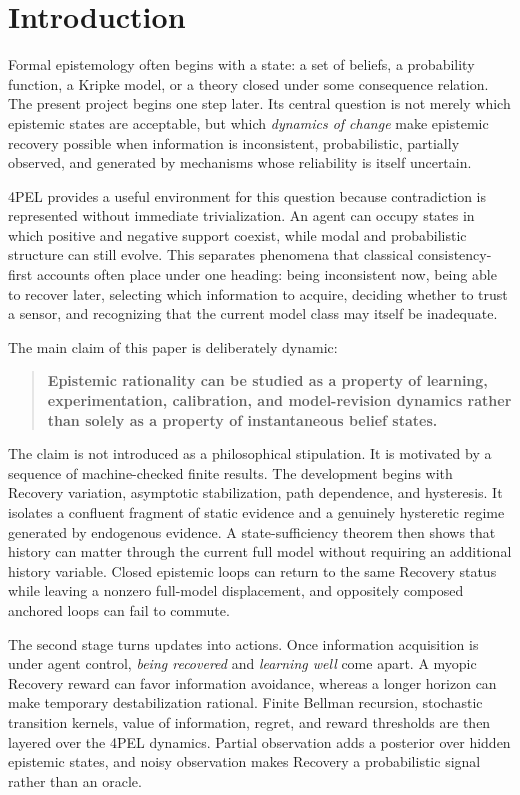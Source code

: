 \section{Introduction}

Formal epistemology often begins with a state: a set of beliefs, a probability function, a Kripke model, or a theory closed under some consequence relation. The present project begins one step later. Its central question is not merely which epistemic states are acceptable, but which \emph{dynamics of change} make epistemic recovery possible when information is inconsistent, probabilistic, partially observed, and generated by mechanisms whose reliability is itself uncertain.

4PEL provides a useful environment for this question because contradiction is represented without immediate trivialization. An agent can occupy states in which positive and negative support coexist, while modal and probabilistic structure can still evolve. This separates phenomena that classical consistency-first accounts often place under one heading: being inconsistent now, being able to recover later, selecting which information to acquire, deciding whether to trust a sensor, and recognizing that the current model class may itself be inadequate.

The main claim of this paper is deliberately dynamic:

\begin{quote}
\textbf{Epistemic rationality can be studied as a property of learning, experimentation, calibration, and model-revision dynamics rather than solely as a property of instantaneous belief states.}
\end{quote}

The claim is not introduced as a philosophical stipulation. It is motivated by a sequence of machine-checked finite results. The development begins with Recovery variation, asymptotic stabilization, path dependence, and hysteresis. It isolates a confluent fragment of static evidence and a genuinely hysteretic regime generated by endogenous evidence. A state-sufficiency theorem then shows that history can matter through the current full model without requiring an additional history variable. Closed epistemic loops can return to the same Recovery status while leaving a nonzero full-model displacement, and oppositely composed anchored loops can fail to commute.

The second stage turns updates into actions. Once information acquisition is under agent control, \emph{being recovered} and \emph{learning well} come apart. A myopic Recovery reward can favor information avoidance, whereas a longer horizon can make temporary destabilization rational. Finite Bellman recursion, stochastic transition kernels, value of information, regret, and reward thresholds are then layered over the 4PEL dynamics. Partial observation adds a posterior over hidden epistemic states, and noisy observation makes Recovery a probabilistic signal rather than an oracle.

